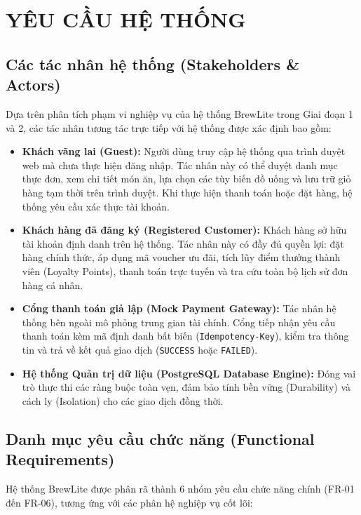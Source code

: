 \chapter{YÊU CẦU HỆ THỐNG}

\section{Các tác nhân hệ thống (Stakeholders \& Actors)}
Dựa trên phân tích phạm vi nghiệp vụ của hệ thống BrewLite trong Giai đoạn 1 và 2, các tác nhân tương tác trực tiếp với hệ thống được xác định bao gồm:

\begin{itemize}
    \item \textbf{Khách vãng lai (Guest):} Người dùng truy cập hệ thống qua trình duyệt web mà chưa thực hiện đăng nhập. Tác nhân này có thể duyệt danh mục thực đơn, xem chi tiết món ăn, lựa chọn các tùy biến đồ uống và lưu trữ giỏ hàng tạm thời trên trình duyệt. Khi thực hiện thanh toán hoặc đặt hàng, hệ thống yêu cầu xác thực tài khoản.
    \item \textbf{Khách hàng đã đăng ký (Registered Customer):} Khách hàng sở hữu tài khoản định danh trên hệ thống. Tác nhân này có đầy đủ quyền lợi: đặt hàng chính thức, áp dụng mã voucher ưu đãi, tích lũy điểm thưởng thành viên (Loyalty Points), thanh toán trực tuyến và tra cứu toàn bộ lịch sử đơn hàng cá nhân.
    \item \textbf{Cổng thanh toán giả lập (Mock Payment Gateway):} Tác nhân hệ thống bên ngoài mô phỏng trung gian tài chính. Cổng tiếp nhận yêu cầu thanh toán kèm mã định danh bất biến (\texttt{Idempotency-Key}), kiểm tra thông tin và trả về kết quả giao dịch (\texttt{SUCCESS} hoặc \texttt{FAILED}).
    \item \textbf{Hệ thống Quản trị dữ liệu (PostgreSQL Database Engine):} Đóng vai trò thực thi các ràng buộc toàn vẹn, đảm bảo tính bền vững (Durability) và cách ly (Isolation) cho các giao dịch đồng thời.
\end{itemize}

\section{Danh mục yêu cầu chức năng (Functional Requirements)}
Hệ thống BrewLite được phân rã thành 6 nhóm yêu cầu chức năng chính (FR-01 đến FR-06), tương ứng với các phân hệ nghiệp vụ cốt lõi:

